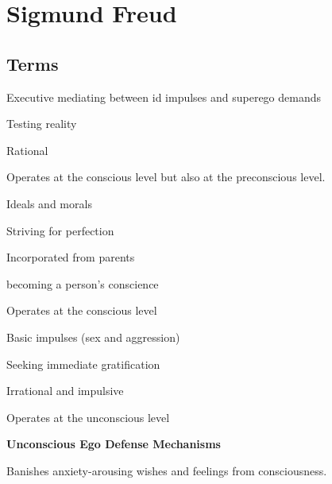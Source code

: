 \section{Sigmund Freud}

\subsection{Terms}

    \begin{coloredlist}
        \item {}
        \begin{coloredlist}
            \item Executive mediating between id impulses and superego demands
            \item Testing reality
            \item Rational
            \item Operates at the conscious level but also at the preconscious level.
        \end{coloredlist}
        \item {}
        \begin{coloredlist}
            \item Ideals and morals
            \item Striving for perfection
            \item Incorporated from parents
            \item becoming a person's conscience
            \item Operates at the conscious level
        \end{coloredlist}
        \item {}
        \begin{coloredlist}
            \item Basic impulses (sex and aggression)
            \item Seeking immediate gratification
            \item Irrational and impulsive
            \item Operates at the unconscious level
        \end{coloredlist}
        \item \textbf{Unconscious Ego Defense Mechanisms}
        \begin{coloredlist}
            \item {}
            \begin{coloredlist}
                \item Banishes anxiety-arousing wishes and feelings from consciousness.

\end{coloredlist}
\end{coloredlist}
\end{coloredlist}
